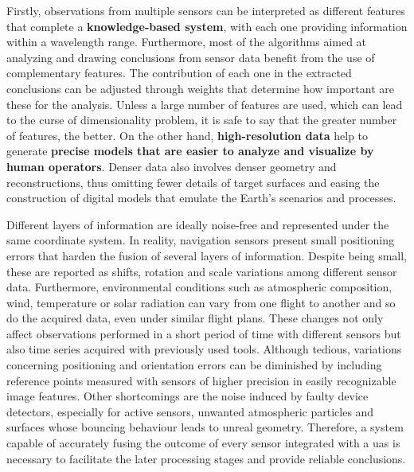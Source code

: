 Firstly, observations from multiple sensors can be interpreted as different features that complete a \textbf{knowledge-based system}, with each one providing information within a wavelength range. Furthermore, most of the algorithms aimed at analyzing and drawing conclusions from sensor data benefit from the use of complementary features. The contribution of each one in the extracted conclusions can be adjusted through weights that determine how important are these for the analysis. Unless a large number of features are used, which can lead to the curse of dimensionality problem, it is safe to say that the greater number of features, the better. On the other hand, \textbf{high-resolution data} help to generate \textbf{precise models that are easier to analyze and visualize by human operators}. Denser data also involves denser geometry and reconstructions, thus omitting fewer details of target surfaces and easing the construction of digital models that emulate the Earth's scenarios and processes. 

Different layers of information are ideally noise-free and represented under the same coordinate system. In reality, navigation sensors present small positioning errors that harden the fusion of several layers of information. Despite being small, these are reported as shifts, rotation and scale variations among different sensor data. Furthermore, environmental conditions such as atmospheric composition, wind, temperature or solar radiation can vary from one flight to another and so do the acquired data, even under similar flight plans. These changes not only affect observations performed in a short period of time with different sensors but also time series acquired with previously used tools. Although tedious, variations concerning positioning and orientation errors can be diminished by including reference points measured with sensors of higher precision in easily recognizable image features. Other shortcomings are the noise induced by faulty device detectors, especially for active sensors, unwanted atmospheric particles and surfaces whose bouncing behaviour leads to unreal geometry. Therefore, a system capable of accurately fusing the outcome of every sensor integrated with a \acrshort{uas} is necessary to facilitate the later processing stages and provide reliable conclusions.

